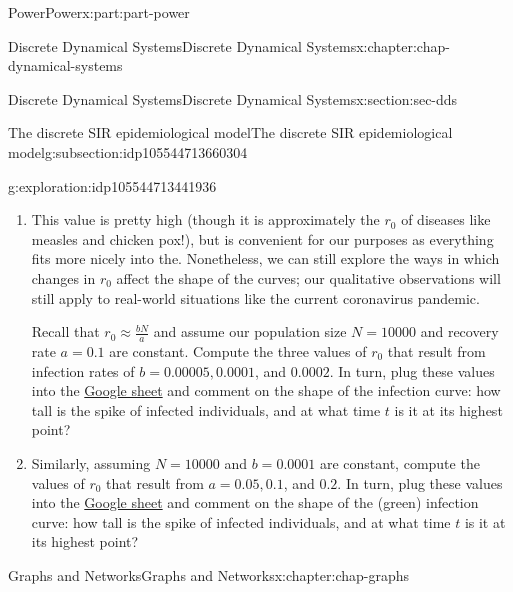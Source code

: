 \documentclass[oneside,10pt,]{book}
\numberwithin{equation}{section}
\begin{document}
\begin{partptx}{Power}{}{Power}{}{}{x:part:part-power}
\begin{chapterptx}{Discrete Dynamical Systems}{}{Discrete Dynamical Systems}{}{}{x:chapter:chap-dynamical-systems}
\begin{sectionptx}{Discrete Dynamical Systems}{}{Discrete Dynamical Systems}{}{}{x:section:sec-dds}
\begin{subsectionptx}{The discrete SIR epidemiological model}{}{The discrete SIR epidemiological model}{}{}{g:subsection:idp105544713660304}
\begin{exploration}{}{g:exploration:idp105544713441936}
\begin{enumerate}
\item{}This value is pretty high (though it is approximately the \(r_0\) of diseases like measles and chicken pox!), but is convenient for our purposes as everything fits more nicely into the. Nonetheless, we can still explore the ways in which changes in \(r_0\) affect the shape of the curves; our qualitative observations will still apply to real-world situations like the current coronavirus pandemic.%
\par
Recall that \(r_0 \approx \frac{bN}{a}\) and assume our population size \(N = 10000\) and recovery rate \(a = 0.1\) are constant. Compute the three values of \(r_0\) that result from infection rates of \(b = 0.00005, 0.0001\), and \(0.0002\). In turn, plug these values into the \href{https://drive.google.com/file/d/1xSJ6KM8x9HVdo9-P4QoUOoSmmfpKmmIQ/view?usp=sharing}{Google sheet}\footnotemark{} and comment on the shape of the infection curve: how tall is the spike of infected individuals, and at what time \(t\) is it at its highest point?%
\item{}Similarly, assuming \(N = 10000\) and \(b = 0.0001\) are constant, compute the values of \(r_0\) that result from \(a = 0.05, 0.1\), and \(0.2\). In turn, plug these values into the \href{https://drive.google.com/file/d/1xSJ6KM8x9HVdo9-P4QoUOoSmmfpKmmIQ/view?usp=sharing}{Google sheet}\footnotemark{} and comment on the shape of the (green) infection curve: how tall is the spike of infected individuals, and at what time \(t\) is it at its highest point?%
\end{enumerate}
\end{exploration}%
%
%
%
\end{subsectionptx}
\end{sectionptx}
\end{chapterptx}
%
\typeout{************************************************}
\typeout{************************************************}
%
\begin{chapterptx}{Graphs and Networks}{}{Graphs and Networks}{}{}{x:chapter:chap-graphs}
\end{chapterptx}

\end{partptx}
\end{document}
